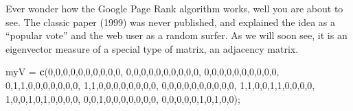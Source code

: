 \documentclass[
]{article}
\newenvironment{Shaded}{\begin{snugshade}}{\end{snugshade}}
\newcommand{\DecValTok}[1]{\textcolor[rgb]{0.00,0.00,0.81}{#1}}
\newcommand{\KeywordTok}[1]{\textcolor[rgb]{0.13,0.29,0.53}{\textbf{#1}}}
\newcommand{\NormalTok}[1]{#1}
\newcommand{\StringTok}[1]{\textcolor[rgb]{0.31,0.60,0.02}{#1}}
\begin{document}
Ever wonder how the Google Page Rank algorithm works, well you are about
to see. The classic paper (1999) was never published, and explained the
idea as a ``popular vote'' and the web user as a random surfer. As we
will soon see, it is an eigenvector measure of a special type of matrix,
an adjacency matrix.

\begin{Shaded}
\begin{Highlighting}[]
\NormalTok{myV =}\StringTok{ }\KeywordTok{c}\NormalTok{(}\DecValTok{0}\NormalTok{,}\DecValTok{0}\NormalTok{,}\DecValTok{0}\NormalTok{,}\DecValTok{0}\NormalTok{,}\DecValTok{0}\NormalTok{,}\DecValTok{0}\NormalTok{,}\DecValTok{0}\NormalTok{,}\DecValTok{0}\NormalTok{,}\DecValTok{0}\NormalTok{,}\DecValTok{0}\NormalTok{,}
        \DecValTok{0}\NormalTok{,}\DecValTok{0}\NormalTok{,}\DecValTok{0}\NormalTok{,}\DecValTok{0}\NormalTok{,}\DecValTok{0}\NormalTok{,}\DecValTok{0}\NormalTok{,}\DecValTok{0}\NormalTok{,}\DecValTok{0}\NormalTok{,}\DecValTok{0}\NormalTok{,}\DecValTok{0}\NormalTok{,}
        \DecValTok{0}\NormalTok{,}\DecValTok{0}\NormalTok{,}\DecValTok{0}\NormalTok{,}\DecValTok{0}\NormalTok{,}\DecValTok{0}\NormalTok{,}\DecValTok{0}\NormalTok{,}\DecValTok{0}\NormalTok{,}\DecValTok{0}\NormalTok{,}\DecValTok{0}\NormalTok{,}\DecValTok{0}\NormalTok{,}
        \DecValTok{0}\NormalTok{,}\DecValTok{1}\NormalTok{,}\DecValTok{1}\NormalTok{,}\DecValTok{0}\NormalTok{,}\DecValTok{0}\NormalTok{,}\DecValTok{0}\NormalTok{,}\DecValTok{0}\NormalTok{,}\DecValTok{0}\NormalTok{,}\DecValTok{0}\NormalTok{,}\DecValTok{0}\NormalTok{,}
        \DecValTok{1}\NormalTok{,}\DecValTok{1}\NormalTok{,}\DecValTok{0}\NormalTok{,}\DecValTok{0}\NormalTok{,}\DecValTok{0}\NormalTok{,}\DecValTok{0}\NormalTok{,}\DecValTok{0}\NormalTok{,}\DecValTok{0}\NormalTok{,}\DecValTok{0}\NormalTok{,}\DecValTok{0}\NormalTok{,}
        \DecValTok{0}\NormalTok{,}\DecValTok{0}\NormalTok{,}\DecValTok{0}\NormalTok{,}\DecValTok{0}\NormalTok{,}\DecValTok{0}\NormalTok{,}\DecValTok{0}\NormalTok{,}\DecValTok{0}\NormalTok{,}\DecValTok{0}\NormalTok{,}\DecValTok{0}\NormalTok{,}\DecValTok{0}\NormalTok{,}
        \DecValTok{1}\NormalTok{,}\DecValTok{1}\NormalTok{,}\DecValTok{0}\NormalTok{,}\DecValTok{0}\NormalTok{,}\DecValTok{1}\NormalTok{,}\DecValTok{1}\NormalTok{,}\DecValTok{0}\NormalTok{,}\DecValTok{0}\NormalTok{,}\DecValTok{0}\NormalTok{,}\DecValTok{0}\NormalTok{,}
        \DecValTok{1}\NormalTok{,}\DecValTok{0}\NormalTok{,}\DecValTok{0}\NormalTok{,}\DecValTok{1}\NormalTok{,}\DecValTok{0}\NormalTok{,}\DecValTok{1}\NormalTok{,}\DecValTok{0}\NormalTok{,}\DecValTok{0}\NormalTok{,}\DecValTok{0}\NormalTok{,}\DecValTok{0}\NormalTok{,}
        \DecValTok{0}\NormalTok{,}\DecValTok{0}\NormalTok{,}\DecValTok{1}\NormalTok{,}\DecValTok{0}\NormalTok{,}\DecValTok{0}\NormalTok{,}\DecValTok{0}\NormalTok{,}\DecValTok{0}\NormalTok{,}\DecValTok{0}\NormalTok{,}\DecValTok{0}\NormalTok{,}\DecValTok{0}\NormalTok{,}
        \DecValTok{0}\NormalTok{,}\DecValTok{0}\NormalTok{,}\DecValTok{0}\NormalTok{,}\DecValTok{0}\NormalTok{,}\DecValTok{0}\NormalTok{,}\DecValTok{1}\NormalTok{,}\DecValTok{0}\NormalTok{,}\DecValTok{1}\NormalTok{,}\DecValTok{0}\NormalTok{,}\DecValTok{0}\NormalTok{);}


\end{Highlighting}
\end{Shaded}
\end{document}
